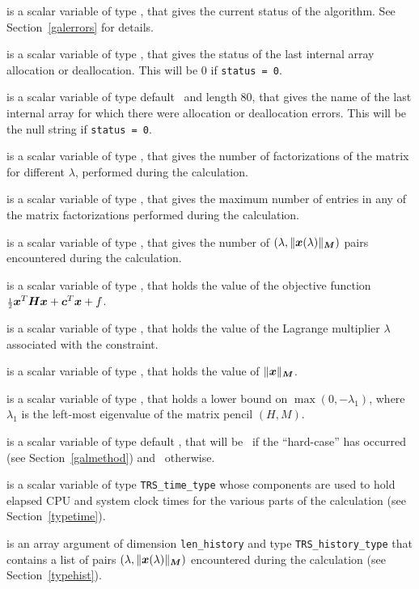 \documentclass{galahad}
\newcommand{\packagename}{TRS}
\begin{document}
\begin{description}
 is a scalar variable of type \integer, that gives the
current status of the algorithm. See Section~\ref{galerrors} for details.

 is a scalar variable of type \integer,
that gives the status of the last internal array allocation
or deallocation. This will be 0 if {\tt status = 0}.

 is a scalar variable of type default \character\
and length 80, that  gives the name of the last internal array
for which there were allocation or deallocation errors.
This will be the null string if {\tt status = 0}.

 is a scalar variable of type \integer, that
gives the number of factorizations of the matrix \req{kkt}
for different $\lambda$, performed during the calculation.

 is a scalar variable of type \integer, that
gives the maximum number of entries in any of the matrix factorizations
performed during the calculation.

 is a scalar variable of type \integer, that gives the
number of $(\lambda,\|{\bm{x}}(\lambda)\|_{{\bm{M}}})$ pairs encountered during the
calculation.

 is a scalar variable of type \realdp, that holds the
value of the objective function ${\scriptstyle \frac{1}{2}} {\bm{x}}^T {\bm{H}} {\bm{x}}  +  {\bm{c}}^T {\bm{x}} + f$.

 is a scalar variable of type \realdp, that holds the
value of the Lagrange multiplier $\lambda$ associated with the constraint.

 is a scalar variable of type \realdp,
that holds the value of $\|{\bm{x}}\|_{{\bm{M}}}$.

 is a scalar variable of type \realdp, that holds a lower
bound on $\max(0,-\lambda_1)$, where $\lambda_1$ is the left-most eigenvalue of
the matrix pencil $(H,M)$.

 is a scalar variable of type default \logical, that will be
\true\ if the ``hard-case'' has occurred (see Section~\ref{galmethod})
and \false\ otherwise.

 is a scalar variable of type {\tt \packagename\_time\_type}
whose components are used to hold elapsed CPU  and system clock times for the
various parts of the calculation (see Section~\ref{typetime}).

 is an array argument of dimension {\tt len\_history} and
type {\tt \packagename\_history\_type} that contains a list of pairs
$(\lambda,\|{\bm{x}}(\lambda)\|_{{\bm{M}}})$ encountered during the
calculation (see Section~\ref{typehist}).


\end{description}
\end{document}
